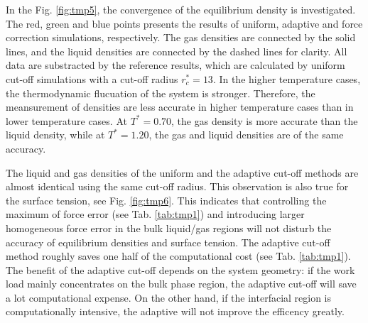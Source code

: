 \documentclass[aps,pre,preprint]{revtex4}
\begin{document}
In the Fig. \ref{fig:tmp5}, the convergence of the equilibrium density
is investigated. The red, green and blue points presents the results
of uniform, adaptive and force correction simulations, respectively.
The gas densities are connected by the solid lines, and the liquid
densities are connected by the dashed lines for clarity. All data are
substracted by the reference results, which are calculated by uniform
cut-off simulations with a cut-off radius $r_c^\ast=13$.  In the
higher temperature cases, the thermodynamic flucuation of the system
is stronger. Therefore, the meansurement of densities are less
accurate in higher temperature cases than in lower temperature cases.
At $T^\ast = 0.70$, the gas density is more accurate than the liquid
density, while at $T^\ast = 1.20$, the gas and liquid densities are of
the same accuracy.

The liquid and gas densities of the uniform and the adaptive cut-off
methods are almost identical using the same cut-off radius. This
observation is also true for the surface tension, see
Fig. \ref{fig:tmp6}. This indicates that controlling the maximum of
force error (see Tab. \ref{tab:tmp1}) and introducing larger
homogeneous force error in the bulk liquid/gas regions will not
disturb the accuracy of equilibrium densities and surface tension.
The adaptive cut-off method roughly saves one half of the
computational cost (see Tab. \ref{tab:tmp1}). The benefit of the
adaptive cut-off depends on the system geometry: if the work load
mainly concentrates on the bulk phase region, the adaptive cut-off
will save a lot computational expense. On the other hand, if the
interfacial region is computationally intensive, the adaptive will not
improve the efficency greatly.
\end{document}
